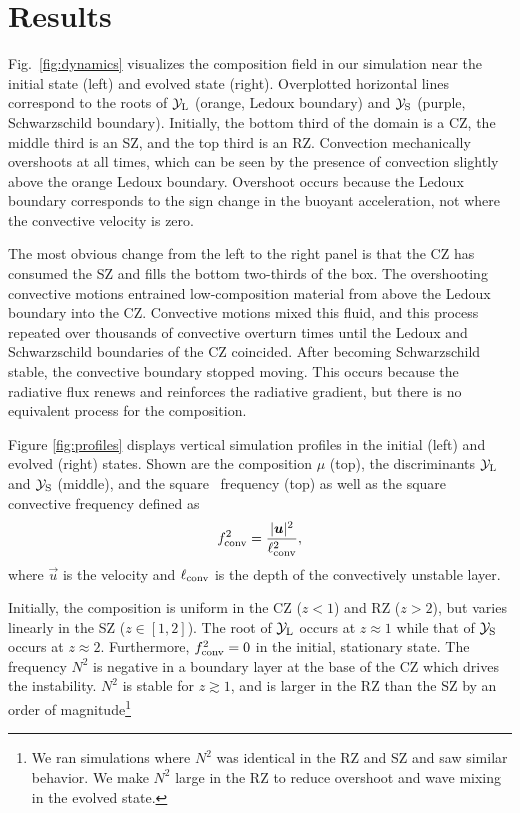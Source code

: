 \section{Results}
\label{sec:results}

Fig.~\ref{fig:dynamics} visualizes the composition field in our simulation near the initial state (left) and evolved state (right).
Overplotted horizontal lines correspond to the roots of $\mathcal{Y}_{\rm{L}}$ (orange, Ledoux boundary) and $\mathcal{Y}_{\rm{S}}$ (purple, Schwarzschild boundary).
Initially, the bottom third of the domain is a CZ, the middle third is an SZ, and the top third is an RZ.
Convection mechanically overshoots at all times, which can be seen by the presence of convection slightly above the orange Ledoux boundary.
Overshoot occurs because the Ledoux boundary corresponds to the sign change in the buoyant acceleration, not where the convective velocity is zero.

The most obvious change from the left to the right panel is that the CZ has consumed the SZ and fills the bottom two-thirds of the box.
The overshooting convective motions entrained low-composition material from above the Ledoux boundary into the CZ.
Convective motions mixed this fluid, and this process repeated over thousands of convective overturn times until the Ledoux and Schwarzschild boundaries of the CZ coincided.
After becoming Schwarzschild stable, the convective boundary stopped moving.
This occurs because the radiative flux renews and reinforces the radiative gradient, but there is no equivalent process for the composition.

Figure \ref{fig:profiles} displays vertical simulation profiles in the initial (left) and evolved (right) states.
Shown are the composition $\mu$ (top), the discriminants $\mathcal{Y}_{\rm{L}}$ and $\mathcal{Y}_{\rm{S}}$ (middle), and the square \brunt$\,$ frequency (top) as well as the square convective frequency defined as
\begin{equation}
f_{\rm{conv}}^2 = \frac{|\vec{u}|^2}{\ell_{\rm{conv}}^2},
\label{eqn:fconv2}
\end{equation}
where $\vec{u}$ is the velocity and $\ell_{\rm{conv}}$ is the depth of the convectively unstable layer.

Initially, the composition is uniform in the CZ ($z < 1$) and RZ ($z > 2$), but varies linearly in the SZ ($z \in [1, 2]$).
The root of $\mathcal{Y}_{\rm{L}}$ occurs at $z \approx 1$ while that of $\mathcal{Y}_{\rm{S}}$ occurs at $z \approx 2$.
Furthermore, $f_{\rm{conv}}^2 = 0$ in the initial, stationary state.
The \brunt$\,$ frequency $N^2$ is negative in a boundary layer at the base of the CZ which drives the instability.
$N^2$ is stable for $z \gtrsim 1$, and is larger in the RZ than the SZ by an order of magnitude\footnote{We ran simulations where $N^2$ was identical in the RZ and SZ and saw similar behavior.
We make $N^2$ large in the RZ to reduce overshoot and wave mixing in the evolved state.}

